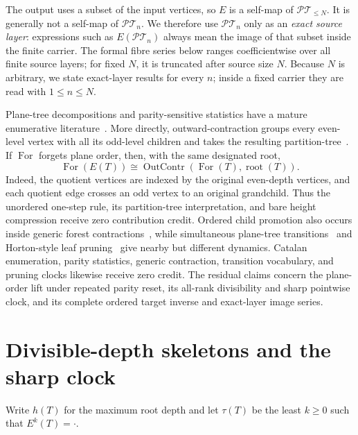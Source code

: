 \documentclass[a4paper,10pt]{amsart}
\theoremstyle{definition}
\theoremstyle{remark}
\newcommand{\PT}{\mathcal{PT}}
\newcommand{\one}{\boldsymbol{\cdot}}
\begin{document}
The output uses a subset of the input vertices, so $E$ is a self-map of
$\PT_{\le N}$.  It is generally not a self-map of $\PT_n$.  We therefore use
$\PT_n$ only as an \emph{exact source layer}: expressions such as
$E(\PT_n)$ always mean the image of that subset inside the finite carrier.
The formal fibre series below ranges coefficientwise over all finite source
layers; for fixed $N$, it is truncated after source size $N$.
Because $N$ is arbitrary, we state exact-layer results for every $n$; inside
a fixed carrier they are read with $1\le n\le N$.

Plane-tree decompositions and parity-sensitive statistics have a mature
enumerative literature~\citep{ChenLiShapiro2007}.  More directly,
outward-contraction groups every even-level vertex with all its odd-level
children and takes the resulting partition-tree~\citep[Definition
6.6]{SooKhoussainovLinz2022}.  If $\operatorname{For}$ forgets plane order,
then, with the same designated root,
\begin{equation}\label{eq:forgetful-owner}
 \operatorname{For}(E(T))\cong
 \operatorname{OutContr}(\operatorname{For}(T),\operatorname{root}(T)).
\end{equation}
Indeed, the quotient vertices are indexed by the original even-depth
vertices, and each quotient edge crosses an odd vertex to an original
grandchild.  Thus the unordered one-step rule, its partition-tree
interpretation, and bare height compression receive zero contribution credit.
Ordered child promotion also occurs inside generic forest
contractions~\citep{BerkemerSiederdissenStadler2021}, while simultaneous
plane-tree transitions~\citep{NicholsEtAl2020} and Horton-style leaf
pruning~\citep{KovchegovZaliapin2016} give nearby but different dynamics.
Catalan enumeration, parity statistics, generic contraction, transition
vocabulary, and pruning clocks likewise receive zero credit.  The residual
claims concern the plane-order lift under repeated parity reset, its all-rank
divisibility and sharp pointwise clock, and its complete ordered target
inverse and exact-layer image series.

\section{Divisible-depth skeletons and the sharp clock}

Write $h(T)$ for the maximum root depth and let $\tau(T)$ be the least
$k\ge0$ such that $E^k(T)=\one$.
\end{document}
